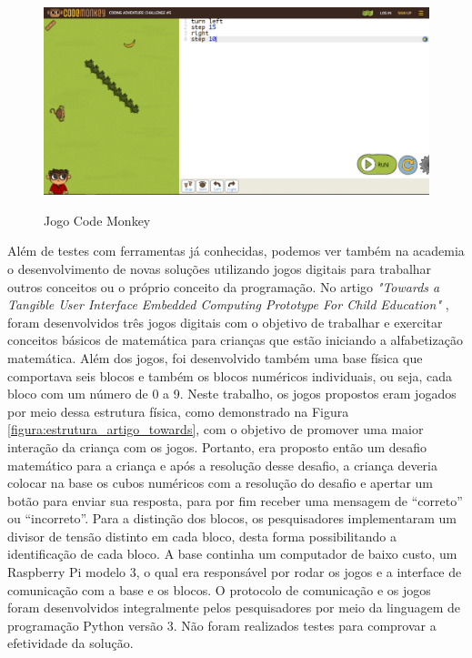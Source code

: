 \begin{figure}[H]
    \caption{Jogo Code Monkey}
    \centering
        \includegraphics[width=\linewidth]{Imagens/cap2/code_monkey.png}
    \label{figura:code_monkey}
\end{figure}

Além de testes com ferramentas já conhecidas, podemos ver também na academia o desenvolvimento de novas soluções utilizando jogos digitais para trabalhar outros conceitos ou o próprio conceito da programação. No artigo \textit{"Towards a Tangible User Interface Embedded Computing Prototype For Child Education"} \cite{carneiro_2018}, foram desenvolvidos três jogos digitais com o objetivo de trabalhar e exercitar conceitos básicos de matemática para crianças que estão iniciando a alfabetização matemática. Além dos jogos, foi desenvolvido também uma base física que comportava seis blocos e também os blocos numéricos individuais, ou seja, cada bloco com um número de 0 a 9. Neste trabalho, os jogos propostos eram jogados por meio dessa estrutura física, como demonstrado na Figura \ref{figura:estrutura_artigo_towards}, com o objetivo de promover uma maior interação da criança com os jogos. Portanto, era proposto então um desafio matemático para a criança e após a resolução desse desafio, a criança deveria colocar na base os cubos numéricos com a resolução do desafio e apertar um botão para enviar sua resposta, para por fim receber uma mensagem de “correto” ou “incorreto”. Para a distinção dos blocos, os pesquisadores implementaram um divisor de tensão distinto em cada bloco, desta forma possibilitando a identificação de cada bloco. A base continha um computador de baixo custo, um Raspberry Pi modelo 3, o qual era responsável por rodar os jogos e a interface de comunicação com a base e os blocos. O protocolo de comunicação e os jogos foram desenvolvidos integralmente pelos pesquisadores por meio da linguagem de programação Python versão 3. Não foram realizados testes para comprovar a efetividade da solução. 

